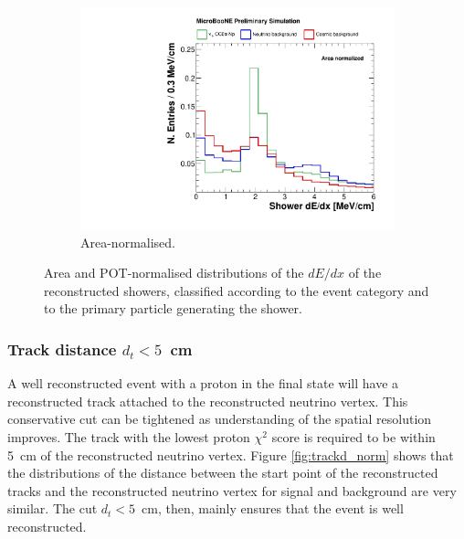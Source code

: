 \begin{figure}[htbp]
\begin{subfigure}{0.49\textwidth}
    \includegraphics[width=\linewidth]{figures/h_shower_dedx_cali_norm.pdf}
    \caption{Area-normalised.} \label{fig:dedx_norm}
  \end{subfigure}
  \caption{Area and POT-normalised distributions of the $dE/dx$ of the reconstructed showers, classified according to the event category and to the primary particle generating the shower.}\label{fig:dedx_datamc}
\end{figure}

\subsubsection*{Track distance $d_{t} < 5$~cm}
A well reconstructed event with a proton in the final state will have a reconstructed track attached to the reconstructed neutrino vertex. This conservative cut can be tightened as understanding of the spatial resolution improves. The track with the lowest proton $\chi^2$ score is required to be within 5~cm of the reconstructed neutrino vertex.
Figure \ref{fig:trackd_norm} shows that the distributions of the distance between the start point of the reconstructed tracks and the reconstructed neutrino vertex for signal and background are very similar. The cut $d_{t} < 5$~cm, then, mainly ensures that the event is well reconstructed. 

